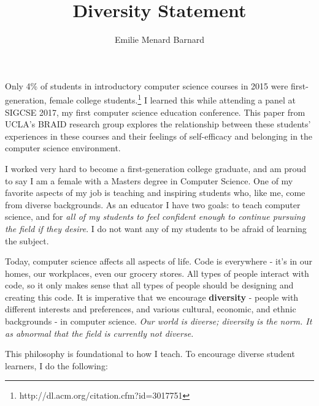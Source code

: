 \documentclass[12pt]{amsart} \usepackage{amssymb}
\title[]{Diversity Statement}
\author[]{Emilie Menard Barnard}
\begin{document}
\maketitle
\thispagestyle{empty}


%
%
%


Only 4\% of students in introductory computer science courses in 2015 were first-generation, female college students.\footnote{http://dl.acm.org/citation.cfm?id=3017751} I learned this while attending a panel at SIGCSE 2017, my first computer science education conference. This paper from UCLA's BRAID research group explores the relationship between these students' experiences in these courses and their feelings of self-efficacy and belonging in the computer science environment. 

I worked very hard to become a first-generation college graduate, and am proud to say I am a female with a Masters degree in Computer Science. One of my favorite aspects of my job is teaching and inspiring students who, like me, come from diverse backgrounds. As an educator I have two goals: to teach computer science, and for \emph{all of my students to feel confident enough to continue pursuing the field if they desire}. I do not want any of my students to be afraid of learning the subject.

Today, computer science affects all aspects of life. Code is everywhere - it's in our homes, our workplaces, even our grocery stores. All types of people interact with code, so it only makes sense that all types of people should be designing and creating this code. It is imperative that we encourage \textbf{diversity} - people with different interests and preferences, and various cultural, economic, and ethnic backgrounds - in computer science. \emph{Our world is diverse; diversity is the norm. It as abnormal that the field is currently not diverse.}

This philosophy is foundational to how I teach. To encourage diverse student learners, I do the following:
\end{document}
